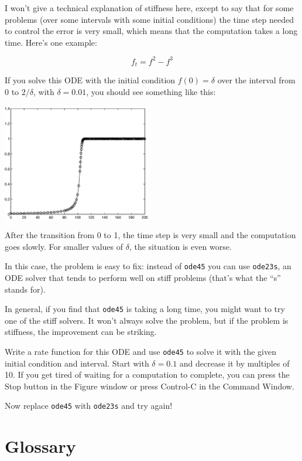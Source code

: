 \documentclass{book}
\begin{document}
I won't give a technical explanation of stiffness here, except
to say that for some problems (over some intervals with some initial
conditions) the time step needed to control the error is very small,
which means that the computation takes a long time. Here's one
example:

\[ f_t = f^2 - f^3 \]

If you solve this ODE with the initial condition $f(0) = \delta$ over
the interval from 0 to $2/\delta$, with $\delta = 0.01$, you should
see something like this:

\beforefig \centerline{\includegraphics[height=2in]{figs/stiff.eps}}

After the transition from 0 to 1, the time step is very small and the
computation goes slowly. For smaller values of $\delta$, the
situation is even worse.

In this case, the problem is easy to fix: instead of {\tt ode45} you can
use {\tt ode23s}, an ODE solver that tends to perform well on stiff
problems (that's what the ``s'' stands for).

In general, if you find that {\tt ode45} is taking a long time, you
might want to try one of the stiff solvers. It won't always solve
the problem, but if the problem is stiffness, the improvement can
be striking.

\begin{ex}
Write a rate function for this ODE and use
{\tt ode45} to solve it with the given initial condition and interval.
Start with $\delta = 0.1$ and decrease it by multiples of 10. If
you get tired of waiting for a computation to complete, you can 
press the Stop button in the Figure window or press Control-C in
the Command Window.

Now replace {\tt ode45} with {\tt ode23s} and try again!
\end{ex}



\section{Glossary}
\end{document}
